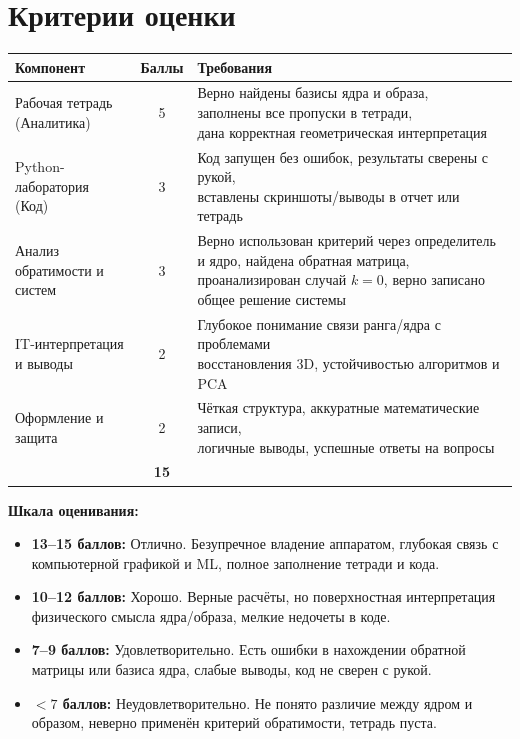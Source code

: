 \documentclass[a4paper,12pt]{article}
\begin{document}
\section{Критерии оценки}
\renewcommand{\arraystretch}{1.25}
\footnotesize
\begin{tabularx}{\textwidth}{@{}>{\raggedright\arraybackslash}p{}c>{\raggedright\arraybackslash}X@{}}
\toprule
\textbf{Компонент} & \textbf{Баллы} & \textbf{Требования} \\
\midrule
Рабочая тетрадь (Аналитика) & 5 & \makecell[l]{Верно найдены базисы ядра и образа, \\ заполнены все пропуски в тетради, \\ дана корректная геометрическая интерпретация} \\
Python-лаборатория (Код) & 3 & \makecell[l]{Код запущен без ошибок, результаты сверены с рукой, \\ вставлены скриншоты/выводы в отчет или тетрадь} \\
Анализ обратимости и систем & 3 & \makecell[l]{Верно использован критерий через определитель и ядро, \\ найдена обратная матрица, проанализирован случай $k=0$, \\ верно записано общее решение системы} \\
IT-интерпретация и выводы & 2 & \makecell[l]{Глубокое понимание связи ранга/ядра с проблемами \\ восстановления 3D, устойчивостью алгоритмов и PCA} \\
Оформление и защита & 2 & \makecell[l]{Чёткая структура, аккуратные математические записи, \\ логичные выводы, успешные ответы на вопросы} \\
\midrule
\multicolumn{2}{@{}l}{\textbf{Итого}} & \textbf{15} \\
\bottomrule
\end{tabularx}

\medskip
\noindent\textbf{Шкала оценивания:}
\begin{itemize}[label=$\circ$, leftmargin=*]
    \item \textbf{13--15 баллов:} Отлично. Безупречное владение аппаратом, глубокая связь с компьютерной графикой и ML, полное заполнение тетради и кода.
    \item \textbf{10--12 баллов:} Хорошо. Верные расчёты, но поверхностная интерпретация физического смысла ядра/образа, мелкие недочеты в коде.
    \item \textbf{7--9 баллов:} Удовлетворительно. Есть ошибки в нахождении обратной матрицы или базиса ядра, слабые выводы, код не сверен с рукой.
    \item \textbf{$<7$ баллов:} Неудовлетворительно. Не понято различие между ядром и образом, неверно применён критерий обратимости, тетрадь пуста.
\end{itemize}
\end{document}
